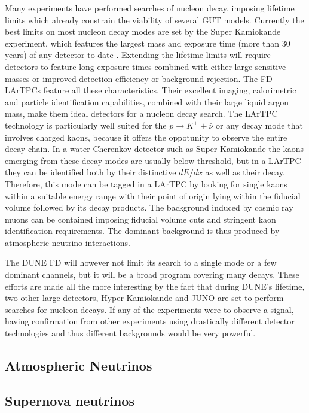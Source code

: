 Many experiments have performed searches of nucleon decay, imposing lifetime limits which already constrain the viability of several GUT models. Currently the best limits on most nucleon decay modes are set by the Super Kamiokande experiment, which features the largest mass and exposure time (more than 30 years) of any detector to date \cite{Super-Kamiokande:2014otb, Super-Kamiokande:2016exg, Super-Kamiokande:2017gev}. Extending the lifetime limits will require detectors to feature long exposure times combined with either large sensitive masses or improved detection efficiency or background rejection. The FD LArTPCs feature all these characteristics. Their excellent imaging, calorimetric and particle identification capabilities, combined with their large liquid argon mass, make them ideal detectors for a nucleon decay search. The LArTPC technology is particularly well suited for the $p\rightarrow K^+ +\bar{\nu}$ or any decay mode that involves charged kaons, because it offers the oppotunity to observe the entire decay chain. In a water Cherenkov detector such as Super Kamiokande the kaons emerging from these decay modes are usually below threshold, but in a LArTPC they can be identified both by their distinctive $dE/dx$ as well as their decay.   Therefore, this mode can be tagged in a LArTPC by looking for single kaons within a suitable  energy range with their point of origin lying within the fiducial volume followed by its decay products. The background induced by cosmic ray muons can be contained imposing fiducial volume cuts and stringent kaon identification requirements. The dominant background is thus produced by atmospheric neutrino interactions.

The DUNE FD will however not limit its search to a single mode or a few dominant channels, but it will be a broad program covering many decays. These efforts are made all the more interesting by the fact that during DUNE's lifetime, two other large detectors, Hyper-Kamiokande \cite{Hyper-Kamiokande:2018ofw} and JUNO \cite{JUNO:2015sjr} are set to perform searches for nucleon decays. If any of the experiments were to observe a signal, having confirmation from other experiments using drastically different detector technologies and thus different backgrounds would be very powerful. 
\subsection{Atmospheric Neutrinos}
\label{Sec:AtmosphericNeutrinos}
\clearpage
\subsection{Supernova neutrinos}
